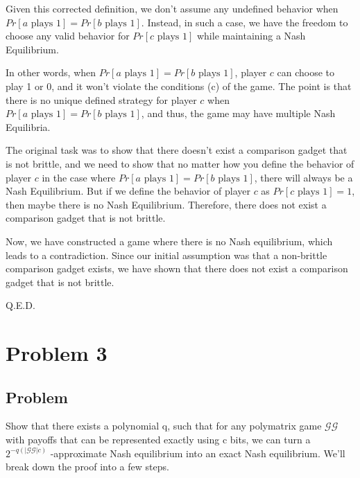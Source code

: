 \documentclass{article}
\begin{document}
Given this corrected definition, we don't assume any undefined behavior when \(Pr[a \text{ plays } 1] = Pr[b \text{ plays } 1]\). Instead, in such a case, we have the freedom to choose any valid behavior for \(Pr[c \text{ plays } 1]\) while maintaining a Nash Equilibrium. 

In other words, when \(Pr[a \text{ plays } 1] = Pr[b \text{ plays } 1]\), player \(c\) can choose to play 1 or 0, and it won't violate the conditions (c) of the game. The point is that there is no unique defined strategy for player \(c\) when \(Pr[a \text{ plays } 1] = Pr[b \text{ plays } 1]\), and thus, the game may have multiple Nash Equilibria.

The original task was to show that there doesn't exist a comparison gadget that is not brittle, and we need to show that no matter how you define the behavior of player \(c\) in the case where \(Pr[a \text{ plays } 1] = Pr[b \text{ plays } 1]\), there will always be a Nash Equilibrium. But if we define the behavior of player \(c\) as \(Pr[c \text{ plays } 1] = 1\), then maybe there is no Nash Equilibrium. Therefore, there does not exist a comparison gadget that is not brittle.

Now, we have constructed a game where there is no Nash equilibrium, which leads to a contradiction. Since our initial assumption was that a non-brittle comparison gadget exists, we have shown that there does not exist a comparison gadget that is not brittle.

Q.E.D.




\section{Problem 3}

\subsection{Problem}
Show that there exists a polynomial q, such that for any polymatrix game \(\mathcal{GG}\) with payoffs that can be represented exactly using c bits, we can turn a \(2^{-q(|\mathcal{GG}|c)}\)
-approximate Nash equilibrium into an exact Nash equilibrium. We'll break down the proof into a few steps.
\end{document}
